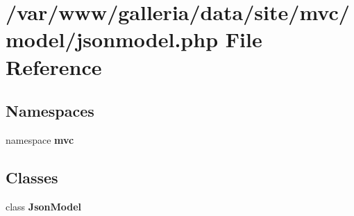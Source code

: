 \section{/var/www/galleria/data/site/mvc/model/jsonmodel.php File Reference}
\label{jsonmodel_8php}
\subsection*{Namespaces}
\begin{CompactItemize}
\item 
namespace {\bf mvc}
\end{CompactItemize}
\subsection*{Classes}
\begin{CompactItemize}
\item 
class {\bf JsonModel}
\end{CompactItemize}
